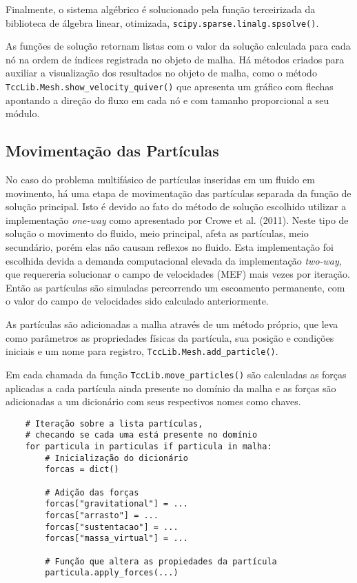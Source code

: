 Finalmente, o sistema algébrico é solucionado pela função terceirizada da biblioteca de álgebra linear, otimizada, \verb|scipy.sparse.linalg.spsolve()|.

As funções de solução retornam listas com o valor da solução calculada para cada nó na ordem de índices registrada no objeto de malha.
Há métodos criados para auxiliar a visualização dos resultados no objeto de malha, como o método \verb|TccLib.Mesh.show_velocity_quiver()| que apresenta um gráfico com flechas apontando a direção do fluxo em cada nó e com tamanho proporcional a seu módulo.


\subsection{\textbf{Movimentação das Partículas}}
No caso do problema multifásico de partículas inseridas em um fluido em movimento, há uma etapa de movimentação das partículas separada da função de solução principal.
Isto é devido ao fato do método de solução escolhido utilizar a implementação \textit{one-way} como apresentado por Crowe et al. (2011)\cite{crowe}.
Neste tipo de solução o movimento do fluido, meio principal,  afeta as partículas, meio secundário, porém elas não causam reflexos no fluido.
Esta implementação foi escolhida devida a demanda computacional elevada da implementação \textit{two-way}, que requereria solucionar o campo de velocidades (MEF) mais vezes por iteração.
Então as partículas são simuladas percorrendo um escoamento permanente, com o valor do campo de velocidades sido calculado anteriormente.

As partículas são adicionadas a malha através de um método próprio, que leva como parâmetros as propriedades físicas da partícula, sua posição e condições iniciais e um nome para registro, \verb|TccLib.Mesh.add_particle()|.

Em cada chamada da função \verb|TccLib.move_particles()| são calculadas as forças aplicadas a cada partícula ainda presente no domínio da malha e as forças são adicionadas a um dicionário com seus respectivos nomes como chaves.
\begin{verbatim}
    # Iteração sobre a lista partículas,
    # checando se cada uma está presente no domínio
    for particula in particulas if particula in malha:
        # Inicialização do dicionário
        forcas = dict()

        # Adição das forças
        forcas["gravitational"] = ...
        forcas["arrasto"] = ...
        forcas["sustentacao"] = ...
        forcas["massa_virtual"] = ...

        # Função que altera as propiedades da partícula
        particula.apply_forces(...)
\end{verbatim}

